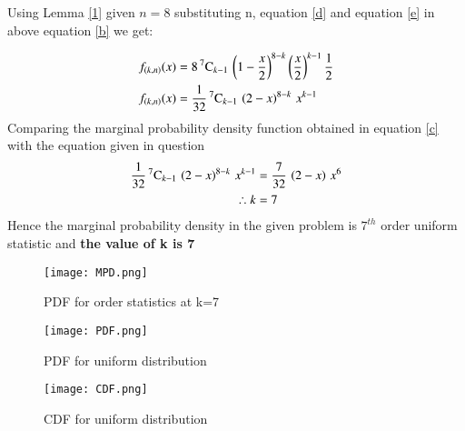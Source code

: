 \documentclass[journal,12pt,twocolumn]{IEEEtran}
\begin{document}
Using Lemma \eqref{1} given $n=8$ substituting n, equation \eqref{d} and equation \eqref{e}  in above equation \eqref{b} we get:

\begin{align}
f_{(k,n)}(x) &= 8\,{}^{7}\mathrm{C}_{k-1}\,\left(1-\dfrac{x}{2}\right)^{8-k}\left(\dfrac{x}{2}\right)^{k-1} \dfrac{1}{2} \\
f_{(k,n)}(x) &= \dfrac{1}{32}\,{}^{7}\mathrm{C}_{k-1}\,\left(2-x\right)^{8-k}\,x^{k-1} \label{c} 
\end{align}
Comparing the marginal probability density function obtained in equation \eqref{c} with the equation given in question
\begin{align}
\dfrac{1}{32}\,{}^{7}\mathrm{C}_{k-1}\,\left(2-x\right)^{8-k}\,x^{k-1} &= \dfrac{7}{32}\,\left(2-x\right)\,x^6 \\
\therefore k &= 7 
\end{align}
Hence the marginal probability density in the given problem is $7^{th}$ order uniform statistic and \textbf{the value of k is 7}

\begin{figure}[htp]
    \centering
    \texttt{[image: MPD.png]}
    \label{fig:maginal probability density}
    \caption{PDF for order statistics at k=7}

    \centering
    \texttt{[image: PDF.png]}
    \label{fig:PDF  of X}
    \caption{PDF for uniform distribution}
   
    \centering
    \texttt{[image: CDF.png]}
    \label{fig:CDF of X}
    \caption{CDF for uniform distribution}
\end{figure}
\end{document}

